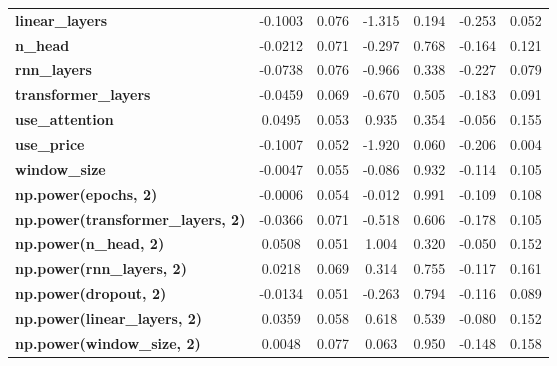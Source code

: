 \begin{center}
\begin{tabular}{lcccccc}
\textbf{linear\_layers}                   &      -0.1003  &        0.076     &    -1.315  &         0.194        &       -0.253    &        0.052     \\
\textbf{n\_head}                          &      -0.0212  &        0.071     &    -0.297  &         0.768        &       -0.164    &        0.121     \\
\textbf{rnn\_layers}                      &      -0.0738  &        0.076     &    -0.966  &         0.338        &       -0.227    &        0.079     \\
\textbf{transformer\_layers}              &      -0.0459  &        0.069     &    -0.670  &         0.505        &       -0.183    &        0.091     \\
\textbf{use\_attention}                   &       0.0495  &        0.053     &     0.935  &         0.354        &       -0.056    &        0.155     \\
\textbf{use\_price}                       &      -0.1007  &        0.052     &    -1.920  &         0.060        &       -0.206    &        0.004     \\
\textbf{window\_size}                     &      -0.0047  &        0.055     &    -0.086  &         0.932        &       -0.114    &        0.105     \\
\textbf{np.power(epochs, 2)}              &      -0.0006  &        0.054     &    -0.012  &         0.991        &       -0.109    &        0.108     \\
\textbf{np.power(transformer\_layers, 2)} &      -0.0366  &        0.071     &    -0.518  &         0.606        &       -0.178    &        0.105     \\
\textbf{np.power(n\_head, 2)}             &       0.0508  &        0.051     &     1.004  &         0.320        &       -0.050    &        0.152     \\
\textbf{np.power(rnn\_layers, 2)}         &       0.0218  &        0.069     &     0.314  &         0.755        &       -0.117    &        0.161     \\
\textbf{np.power(dropout, 2)}             &      -0.0134  &        0.051     &    -0.263  &         0.794        &       -0.116    &        0.089     \\
\textbf{np.power(linear\_layers, 2)}      &       0.0359  &        0.058     &     0.618  &         0.539        &       -0.080    &        0.152     \\
\textbf{np.power(window\_size, 2)}        &       0.0048  &        0.077     &     0.063  &         0.950        &       -0.148    &        0.158     \\

\end{tabular}
\end{center}
